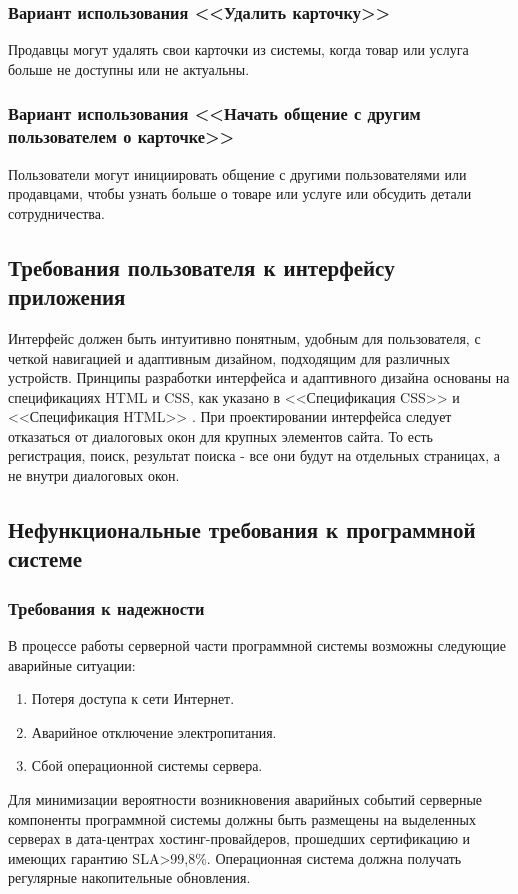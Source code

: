\subsubsection{Вариант использования <<Удалить карточку>>}
Продавцы могут удалять свои карточки из системы, когда товар или услуга больше не доступны или не актуальны.

\subsubsection{Вариант использования <<Начать общение с другим пользователем о карточке>>}
Пользователи могут инициировать общение с другими пользователями или продавцами, чтобы узнать больше о товаре или услуге или обсудить детали сотрудничества.

\subsection{Требования пользователя к интерфейсу приложения}
Интерфейс должен быть интуитивно понятным, удобным для пользователя, с четкой навигацией и адаптивным дизайном, подходящим для различных устройств. Принципы разработки интерфейса и адаптивного дизайна основаны на спецификациях HTML и CSS, как указано в <<Спецификация CSS>> \cite{cssspecs} и <<Спецификация HTML>> \cite{htmlbook}.
При проектировании интерфейса следует отказаться от диалоговых окон для крупных элементов сайта. То есть регистрация, поиск, результат поиска - все они будут на отдельных страницах, а не внутри диалоговых окон.

\subsection{Нефункциональные требования к программной системе}

\subsubsection{Требования к надежности}
В процессе работы серверной части программной системы возможны следующие аварийные ситуации:
\begin{enumerate}
\item Потеря доступа к сети Интернет.
\item Аварийное отключение электропитания.
\item Сбой операционной системы сервера.
\end{enumerate}

Для минимизации вероятности возникновения аварийных событий серверные компоненты программной системы должны быть размещены на выделенных серверах в дата-центрах хостинг-провайдеров, прошедших сертификацию и имеющих гарантию SLA>99,8\%. Операционная система должна получать регулярные накопительные обновления.

